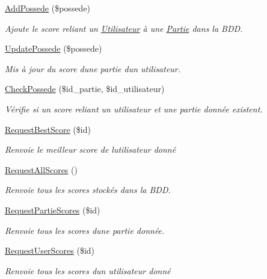 \begin{DoxyCompactItemize}
\mbox{\hyperlink{class_interface_b_d_d_a4247c06c17b9c86dbc80321220969862}{Add\+Possede}} (\$possede)
\begin{DoxyCompactList}\small\item\em Ajoute le score reliant un \mbox{\hyperlink{class_utilisateur}{Utilisateur}} à une \mbox{\hyperlink{class_partie}{Partie}} dans la B\+DD. \end{DoxyCompactList}\item 
\mbox{\hyperlink{class_interface_b_d_d_adff6bf7ab712728f7898296d73bbd71b}{Update\+Possede}} (\$possede)
\begin{DoxyCompactList}\small\item\em Mis à jour du score d\textquotesingle{}une partie d\textquotesingle{}un utilisateur. \end{DoxyCompactList}\item 
\mbox{\hyperlink{class_interface_b_d_d_abdd3159f3f18a5aba6f1f29907489073}{Check\+Possede}} (\$id\+\_\+partie, \$id\+\_\+utilisateur)
\begin{DoxyCompactList}\small\item\em Vérifie si un score reliant un utilisateur et une partie donnée existent. \end{DoxyCompactList}\item 
\mbox{\hyperlink{class_interface_b_d_d_ac5d8ed61cc01eba73c0060a4561702dd}{Request\+Best\+Score}} (\$id)
\begin{DoxyCompactList}\small\item\em Renvoie le meilleur score de l\textquotesingle{}utilisateur donné \end{DoxyCompactList}\item 
\mbox{\hyperlink{class_interface_b_d_d_a4d1d3a0c3fed3edec5e93a039e5cc15a}{Request\+All\+Scores}} ()
\begin{DoxyCompactList}\small\item\em Renvoie tous les scores stockés dans la B\+DD. \end{DoxyCompactList}\item 
\mbox{\hyperlink{class_interface_b_d_d_aeb87620551f2e3cd7a7aac388d857534}{Request\+Partie\+Scores}} (\$id)
\begin{DoxyCompactList}\small\item\em Renvoie tous les scores d\textquotesingle{}une partie donnée. \end{DoxyCompactList}\item 
\mbox{\hyperlink{class_interface_b_d_d_a0e5add57564c5205c91a6bc6c8b1dcdb}{Request\+User\+Scores}} (\$id)
\begin{DoxyCompactList}\small\item\em Renvoie tous les scores d\textquotesingle{}un utilisateur donné \end{DoxyCompactList}\item 

\end{DoxyCompactItemize}
